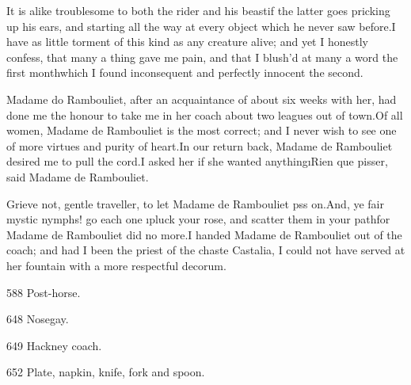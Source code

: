 \documentclass[twoside]{article}
\begin{document}
It is alike troublesome to both the rider and his beast\tsk if the latter
goes pricking up his ears, and starting all the way at every object which
he never saw before.\tsk I have as little torment of this kind as any
creature alive; and yet I honestly confess, that many a thing gave me
pain, and that I blush’d at many a word the first month\tsk which I found
inconsequent and perfectly innocent the second.

Madame do Rambouliet, after an acquaintance of about six weeks with her,
had done me the honour to take me in her coach about two leagues out of
town.\tsk Of all women, Madame de Rambouliet is the most correct; and I never
wish to see one of more virtues and purity of heart.\tsk In our return back,
Madame de Rambouliet desired me to pull the cord.\tsk I asked her if she
wanted anything\tsk \i{Rien que pisser}, said Madame de Rambouliet.

Grieve not, gentle traveller, to let Madame de Rambouliet p\tsk ss on.\tsk And,
ye fair mystic nymphs! go each one \i{pluck your rose}, and scatter them in
your path\tsk for Madame de Rambouliet did no more.\tsk I handed Madame de
Rambouliet out of the coach; and had I been the priest of the chaste
Castalia, I could not have served at her fountain with a more respectful
decorum.










{588}  Post-horse.

{648}  Nosegay.

{649}  Hackney coach.

{652}  Plate, napkin, knife, fork and spoon.
\end{document}
